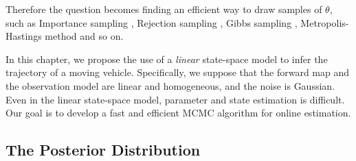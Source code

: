 Therefore the question becomes finding an efficient way to draw samples of $\theta$, such as Importance sampling \citep{hammersley1964percolation, geweke1989bayesian}, Rejection sampling \citep{casella2004generalized, martino2010generalized}, Gibbs sampling \citep{geman1984stochastic}, Metropolis-Hastings method \citep{metropolis1953equation, hastings1970monte} and so on. 

In this chapter, we propose the use of a \textit{linear}  state-space model to infer the trajectory of a moving vehicle. Specifically, we suppose that the forward map and the observation model are linear and homogeneous, and the noise is Gaussian. Even in the linear state-space model, parameter and state estimation is difficult. Our goal is to develop a fast and efficient MCMC algorithm for online estimation. 




\subsection{The Posterior Distribution}\label{sectionlogParameter}

